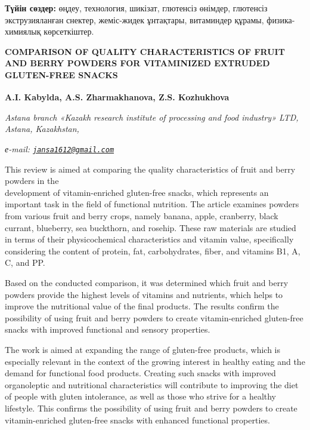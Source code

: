 {\bfseries Түйін сөздер:} өңдеу, технология, шикізат, глютенсіз өнімдер,
глютенсіз экструзияланған снектер, жеміс-жидек ұнтақтары, витаминдер
құрамы, физика-химиялық көрсеткіштер.

\begin{articleheader}
{\bfseries COMPARISON OF QUALITY CHARACTERISTICS OF FRUIT AND BERRY POWDERS FOR VITAMINIZED EXTRUDED GLUTEN-FREE SNACKS}

{\bfseries
A.I. Kabylda,
A.S. Zharmakhanova,
Z.S. Kozhukhova\textsuperscript{\envelope }}
\end{articleheader}

\begin{affiliation}
\emph{Astana branch «Kazakh research institute of processing and food industry» LTD, Astana, Kazakhstan,}

\emph{е-mail: \href{mailto:jansa1612@gmail.com}{\nolinkurl{jansa1612@gmail.com}}}
\end{affiliation}

This review is aimed at comparing the quality characteristics of fruit
and berry powders in the \\development of vitamin-enriched gluten-free
snacks, which represents an important task in the field of functional
nutrition. The article examines powders from various fruit and berry
crops, namely banana, apple, cranberry, black currant, blueberry, sea
buckthorn, and rosehip. These raw materials are studied in terms of
their physicochemical characteristics and vitamin value, specifically
considering the content of protein, fat, carbohydrates, fiber, and
vitamins B1, A, C, and PP.

Based on the conducted comparison, it was determined which fruit and
berry powders provide the highest levels of vitamins and nutrients,
which helps to improve the nutritional value of the final products. The
results confirm the possibility of using fruit and berry powders to
create vitamin-enriched gluten-free snacks with improved functional and
sensory properties.

The work is aimed at expanding the range of gluten-free products, which
is especially relevant in the context of the growing interest in healthy
eating and the demand for functional food products. Creating such snacks
with improved organoleptic and nutritional characteristics will
contribute to improving the diet of people with gluten intolerance, as
well as those who strive for a healthy lifestyle. This confirms the
possibility of using fruit and berry powders to create vitamin-enriched
gluten-free snacks with enhanced functional properties.

